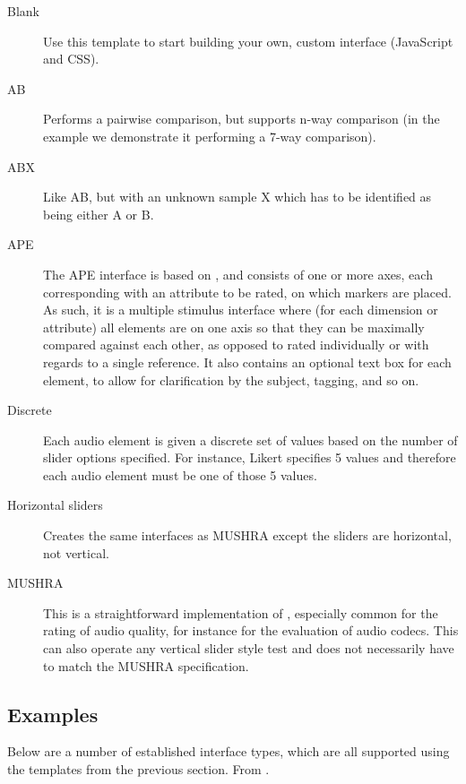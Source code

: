 \documentclass[11pt, oneside]{article}   	%
\begin{document}
		\begin{description}
			\item[Blank] Use this template to start building your own, custom interface (JavaScript and CSS). 

			\item[AB] Performs a pairwise comparison, but supports n-way comparison (in the example we demonstrate it performing a 7-way comparison).

			\item[ABX] Like AB, but with an unknown sample X which has to be identified as being either A or B. 

			\item[APE] The APE interface is based on \cite{ape}, and consists of one or more axes, each corresponding with an attribute to be rated, on which markers are placed. As such, it is a multiple stimulus interface where (for each dimension or attribute) all elements are on one axis so that they can be maximally compared against each other, as opposed to rated individually or with regards to a single reference. 
			It also contains an optional text box for each element, to allow for clarification by the subject, tagging, and so on. 

			\item[Discrete] Each audio element is given a discrete set of values based on the number of slider options specified. For instance, Likert specifies 5 values and therefore each audio element must be one of those 5 values.

			\item[Horizontal sliders] Creates the same interfaces as MUSHRA except the sliders are horizontal, not vertical.

			\item[MUSHRA] This is a straightforward implementation of \cite{mushra}, especially common for the rating of audio quality, for instance for the evaluation of audio codecs. This can also operate any vertical slider style test and does not necessarily have to match the MUSHRA specification.
		\end{description}
		    

	\subsection{Examples}
		Below are a number of established interface types, which are all supported using the templates from the previous section. %
		From \cite{waetwac}. 

\end{document}
